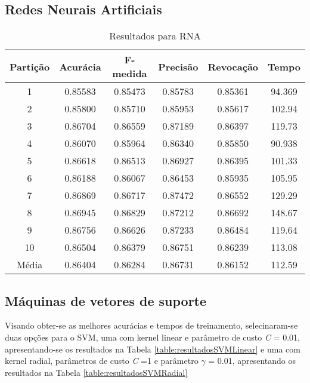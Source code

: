 \subsection{Redes Neurais Artificiais}
\begin{table}[h]
\centering
\caption{Resultados para RNA}
\vspace{0.2cm}
\begin{tabular}{c|c|c|c|c|c}
Partição & Acurácia & F-medida & Precisão & Revocação & Tempo \\
\hline
1  & 0.85583 & 0.85473 & 0.85783 & 0.85361 & 94.369 \\
2  & 0.85800 & 0.85710 & 0.85953 & 0.85617 & 102.94 \\
3  & 0.86704 & 0.86559 & 0.87189 & 0.86397 & 119.73 \\
4  & 0.86070 & 0.85964 & 0.86340 & 0.85850 & 90.938 \\
5  & 0.86618 & 0.86513 & 0.86927 & 0.86395 & 101.33 \\
6  & 0.86188 & 0.86067 & 0.86453 & 0.85935 & 105.95 \\
7  & 0.86869 & 0.86717 & 0.87472 & 0.86552 & 129.29 \\
8  & 0.86945 & 0.86829 & 0.87212 & 0.86692 & 148.67 \\
9  & 0.86756 & 0.86626 & 0.87233 & 0.86484 & 119.64 \\
10 & 0.86504 & 0.86379 & 0.86751 & 0.86239 & 113.08 \\
\hline
Média & 0.86404 & 0.86284 & 0.86731 & 0.86152 & 112.59 \\
\end{tabular} 
\label{table:resultadosRNA}
\end{table}

\subsection{Máquinas de vetores de suporte}

Visando obter-se as melhores acurácias e tempos de treinamento, selecinaram-se duas opções para o SVM, uma com kernel linear e parâmetro de custo \emph{C} = 0.01, apresentando-se os resultados na Tabela \ref{table:resultadosSVMLinear} e uma com kernel radial, parâmetros de custo \emph{C} =1 e parâmetro \(\gamma\) = 0.01, apresentando os resultados na Tabela \ref{table:resultadosSVMRadial}

